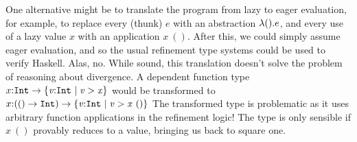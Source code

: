 
%
One alternative might be to translate the program from lazy to eager evaluation,
for example, to replace every (thunk) $e$ with an abstraction $\lambda (). e$,
and every use of a lazy value $x$ with an application $x\ ()$. 
After this, we could simply assume eager evaluation, and so the usual refinement
type systems could be used to verify Haskell. Alas, no. 
While sound, this translation
doesn't solve the problem
of reasoning about divergence. 
A dependent function type
${\tfun{x}{\tint}{\tlref{\vv}{\tint}{}{\vv>\x}}}$
would be transformed to
${\tfun{x}{(\tfunbasic{()}{\tint})}
          {\tlref{\vv}{\tint}{}{\vv > \x\ ()}}}$
%
%
The transformed type is problematic as it uses 
arbitrary function applications in the refinement logic!
%
The type is only sensible if $x\ ()$ provably reduces to a value, 
bringing us back to square one.

